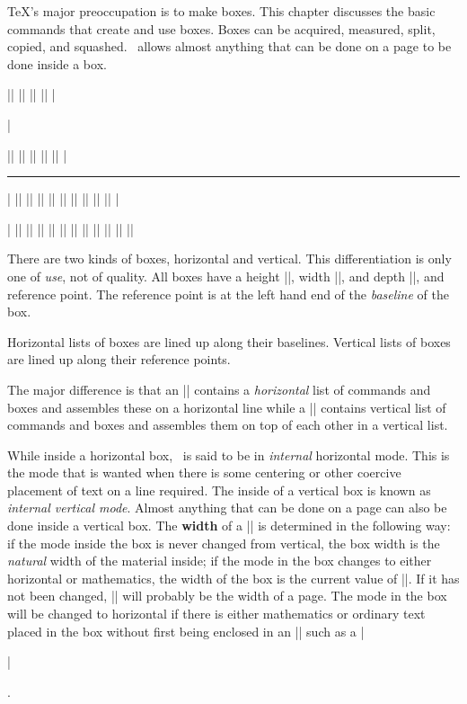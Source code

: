  \relax \fi %

\def\cqu{}

\TeX 's major preoccupation is to make
boxes. This chapter discusses the basic commands that create and use boxes.
Boxes can be acquired, measured, split, copied, and squashed. \tex\ allows
almost anything that can be done on a page to be done inside a box.

\beginthreecolumn
\pri|\box|
\ext|\boxit|
\pri|\boxmaxdepth|
\pri|\copy|
\pla|\centerline|
\pri|\dp|
\pri|\everyhbox|
\pri|\everyvbox|
\pri|\hbox|
\pri|\ht|
\pri|\hrule|
\pla|\leftline|
\pla|\line|
\pla|\llap|
\pri|\lower|
\pla|\newbox|
\pri|\raise|
\pla|\rightline|
\pla|\rlap|
\pri|\setbox|
\ext|\strut|
\pri|\unhbox|
\pri|\unhcopy|
\pri|\unvbox|
\pri|\unvcopy|
\pri|\vbox|
\pri|\vcenter|
\pri|\vrule|
\pri|\vsplit|
\pri|\vtop|
\pri|\wd|
\ext|\zerocenteredbox|
\endthreecolumn

There are two kinds of boxes, horizontal and vertical. This 
differentiation is only one of {\it use}, not of quality. All boxes have a
height |\ht|, width |\wd|, and depth |\dp|, and reference point. 
The reference point is at the left hand end of the {\it baseline} of the box.

\boxexample
\noindent
Horizontal lists of boxes are lined up along their baselines. Vertical lists
of boxes are lined up along their reference points.



The major difference is that
an |\hbox| contains a {\it horizontal} list of commands and boxes and
assembles  these on a horizontal line while a 
|\vbox| contains vertical list of commands and boxes and assembles them on
top of each other in a vertical list.

While inside a horizontal box, \tex\ is said to be in {\it internal}
horizontal mode. This is the mode that is wanted when there is some centering
or other coercive placement of text on a line required. 
The inside of a vertical box is known as {\it internal vertical mode}. Almost
anything that can be done on a page can also be done inside a vertical box.
The {\bf width} of a |\vbox| is determined in the following way: if the mode
inside the box is never changed from
vertical, the box width is the {\it natural} width of the material inside; if
the mode in the box changes to either horizontal or mathematics, the width of
the box is the current value of |\hsize|. If it has not been changed,
|\hsize| will probably be the width of a page. The mode in the box will be
changed to horizontal if there is either mathematics or ordinary text placed
in the box without first being enclosed in an |\hbox| such as a
|\centerline|. 

